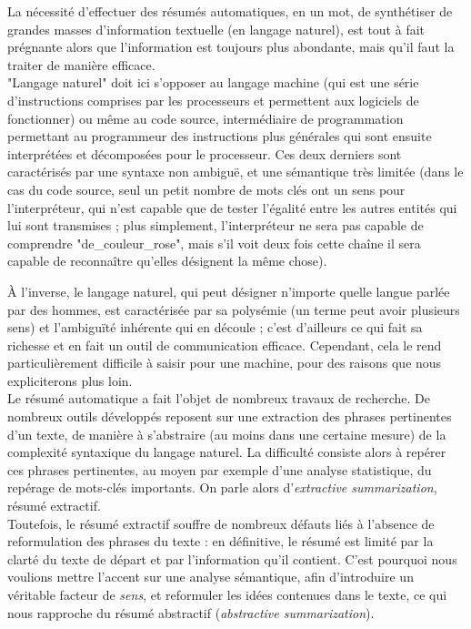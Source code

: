 \documentclass[a4paper, 12pt]{article}
\begin{document}
La nécessité d'effectuer des résumés automatiques, en un mot, de synthétiser de grandes masses d'information textuelle (en langage naturel), est tout à fait prégnante alors que l'information est toujours plus abondante, mais qu'il faut la traiter de manière efficace.\\

"Langage naturel" doit ici s'opposer au langage machine (qui est une série d'instructions comprises par les processeurs et permettent aux logiciels de fonctionner) ou même au code source, intermédiaire de programmation permettant au programmeur des instructions plus générales qui sont ensuite interprétées et décomposées pour le processeur. Ces deux derniers sont caractérisés par une syntaxe non ambiguë, et une sémantique très limitée (dans le cas du code source, seul un petit nombre de mots clés ont un sens pour l'interpréteur, qui n'est capable que de tester l'égalité entre les autres entités qui lui sont transmises ; plus simplement, l'interpréteur ne sera pas capable de comprendre "de\_couleur\_rose", mais s'il voit deux fois cette chaîne il sera capable de reconnaître qu'elles désignent la même chose).

À l'inverse, le langage naturel, qui peut désigner n'importe quelle langue parlée par des hommes, est caractérisée par sa polysémie (un terme peut avoir plusieurs sens) et l'ambiguïté inhérente qui en découle ; c'est d'ailleurs ce qui fait sa richesse et en fait un outil de communication efficace. Cependant, cela le rend particulièrement difficile à saisir pour une machine, pour des raisons que nous expliciterons plus loin.\\

Le résumé automatique a fait l'objet de nombreux travaux de recherche. De nombreux outils développés reposent sur une extraction des phrases pertinentes d'un texte, de manière à s'abstraire (au moins dans une certaine mesure) de la complexité syntaxique du langage naturel. La difficulté consiste alors à repérer ces phrases pertinentes, au moyen par exemple d'une analyse statistique, du repérage de mots-clés importants. On parle alors d'\textit{extractive summarization}, résumé extractif.\\

Toutefois, le résumé extractif souffre de nombreux défauts liés à l'absence de reformulation des phrases du texte : en définitive, le résumé est limité par la clarté du texte de départ et par l'information qu'il contient. C'est pourquoi nous voulions mettre l'accent sur une analyse sémantique, afin d'introduire un véritable facteur de \textit{sens}, et reformuler les idées contenues dans le texte, ce qui nous rapproche du résumé abstractif (\textit{abstractive summarization}).\\
\end{document}
